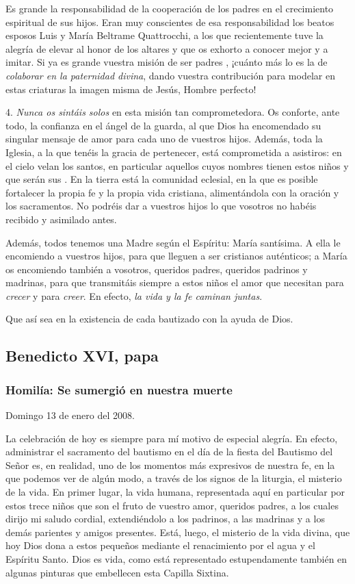 {Es grande la responsabilidad de la cooperación de los padres en el crecimiento espiritual de sus hijos. Eran muy conscientes de esa responsabilidad los beatos esposos Luis y María Beltrame Quattrocchi, a los que recientemente tuve la alegría de elevar al honor de los altares y que os exhorto a conocer mejor y a imitar. Si ya es grande vuestra misión de ser padres , ¡cuánto más lo es la de \emph{colaborar en la paternidad divina}, dando vuestra contribución para modelar en estas criaturas la imagen misma de Jesús, Hombre perfecto!

4. \emph{Nunca os sintáis solos} en esta misión tan comprometedora. Os conforte, ante todo, la confianza en el ángel de la guarda, al que Dios ha encomendado su singular mensaje de amor para cada uno de vuestros hijos. Además, toda la Iglesia, a la que tenéis la gracia de pertenecer, está comprometida a asistiros: en el cielo velan los santos, en particular aquellos cuyos nombres tienen estos niños y que serán sus . En la tierra está la comunidad eclesial, en la que es posible fortalecer la propia fe y la propia vida cristiana, alimentándola con la oración y los sacramentos. No podréis dar a vuestros hijos lo que vosotros no habéis recibido y asimilado antes.

Además, todos tenemos una Madre según el Espíritu: María santísima. A ella le encomiendo a vuestros hijos, para que lleguen a ser cristianos auténticos; a María os encomiendo también a vosotros, queridos padres, queridos padrinos y madrinas, para que transmitáis siempre a estos niños el amor que necesitan para \emph{crecer} y para \emph{creer}. En efecto, \emph{la vida y la fe caminan juntas}.

Que así sea en la existencia de cada bautizado con la ayuda de Dios.

\subsection{Benedicto XVI, papa}

\subsubsection{Homilía: Se sumergió en nuestra muerte}

Domingo 13 de enero del 2008.

La celebración de hoy es siempre para mí motivo de especial alegría. En efecto, administrar el sacramento del bautismo en el día de la fiesta del Bautismo del Señor es, en realidad, uno de los momentos más expresivos de nuestra fe, en la que podemos ver de algún modo, a través de los signos de la liturgia, el misterio de la vida. En primer lugar, la vida humana, representada aquí en particular por estos trece niños que son el fruto de vuestro amor, queridos padres, a los cuales dirijo mi saludo cordial, extendiéndolo a los padrinos, a las madrinas y a los demás parientes y amigos presentes. Está, luego, el misterio de la vida divina, que hoy Dios dona a estos pequeños mediante el renacimiento por el agua y el Espíritu Santo. Dios es vida, como está representado estupendamente también en algunas pinturas que embellecen esta Capilla Sixtina.

}
